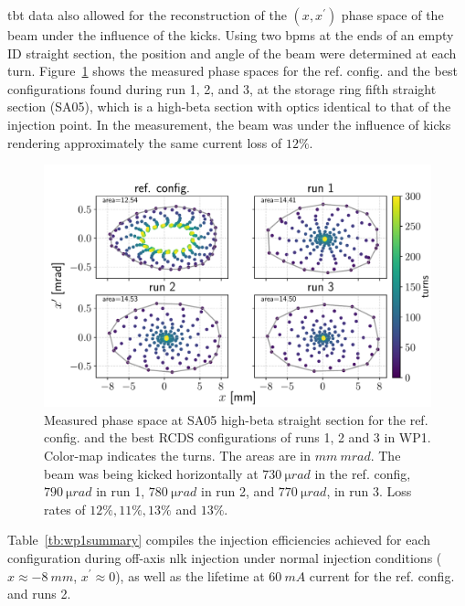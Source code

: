 \gls*{tbt} data also allowed for the reconstruction of the $(x,x^\prime)$ phase space of the beam under the influence of the kicks. Using two \glspl*{bpm} at the ends of an empty ID straight section, the position and angle of the beam were determined at each turn. Figure~\ref{fig:oldtunes_phase} shows the measured phase spaces for the ref. config. and the best configurations found during run 1, 2, and 3, at the storage ring fifth straight section (SA05), which is a high-beta section with optics identical to that of the injection point. In the measurement, the beam was under the influence of kicks rendering approximately the same current loss of $12\%$.
\begin{figure}[tb]
    \centering
        \includegraphics[width=\textwidth]{Images/WEPL087_f2.pdf}
        \caption[Measured phase space at SA05 high-beta straight section for the ref. config. and the best RCDS configurations of runs 1, 2 and 3 in WP1.]{Measured phase space at SA05 high-beta straight section for the ref. config. and the best \gls*{RCDS} configurations of runs 1, 2 and 3 in \gls*{WP1}. Color-map indicates the turns. The areas are in $\unit{mm}~\unit{mrad}$. The beam was being kicked horizontally at $730~\unit{\micro rad}$ in the ref. config, $790~\unit{\micro rad}$ in run 1, $780~\unit{\micro rad}$ in run 2, and $770~\unit{\micro rad}$, in run 3. Loss rates of  $12\%, 11\%, 13\%$ and $13\%$.}
        \label{fig:oldtunes_phase}
\end{figure}

Table~\ref{tb:wp1summary} compiles the injection efficiencies achieved for each configuration during off-axis \gls*{nlk} injection under normal injection conditions ($x\approx -8~\unit{mm}$, $x^\prime\approx 0 $), as well as the lifetime at $60~\unit{mA}$ current for the ref. config. and runs 2.

